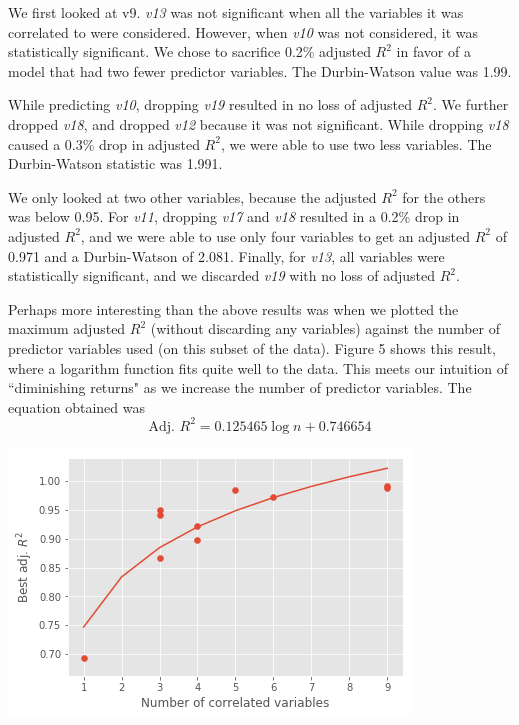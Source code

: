 \documentclass[12pt,a4paper,twocolumn]{article}
\begin{document}
	We first looked at v9. \textit{v13} was not significant when all the variables it was correlated to were considered. However, when \textit{v10} was not considered, it was statistically significant. We chose to sacrifice 0.2\% adjusted $R^2$ in favor of a model that had two fewer predictor variables. The Durbin-Watson value was 1.99.
	
	While predicting \textit{v10}, dropping \textit{v19} resulted in no loss of adjusted $R^2$. We further dropped \textit{v18}, and dropped \textit{v12} because it was not significant. While dropping \textit{v18} caused a 0.3\% drop in adjusted $R^2$, we were able to use two less variables. The Durbin-Watson statistic was 1.991.
	
	We only looked at two other variables, because the adjusted $R^2$ for the others was below 0.95. For \textit{v11}, dropping \textit{v17} and \textit{v18} resulted in a 0.2\% drop in adjusted $R^2$, and we were able to use only four variables to get an adjusted $R^2$ of 0.971 and a Durbin-Watson of 2.081. Finally, for \textit{v13}, all variables were statistically significant, and we discarded \textit{v19} with no loss of adjusted $R^2$.
	
	Perhaps more interesting than the above results was when we plotted the maximum adjusted $R^2$ (without discarding any variables) against the number of predictor variables used (on this subset of the data). Figure 5 shows this result, where a logarithm function fits quite well to the data. This meets our intuition of ``diminishing returns" as we increase the number of predictor variables. The equation obtained was
	\begin{equation}
	\text{Adj. } R^2 = 0.125465 \log n + 0.746654
	\end{equation}
	
	\includegraphics[scale=0.5]{fig5.png}
	\begingroup
	\endgroup
	\hfill\break
	
\end{document}

